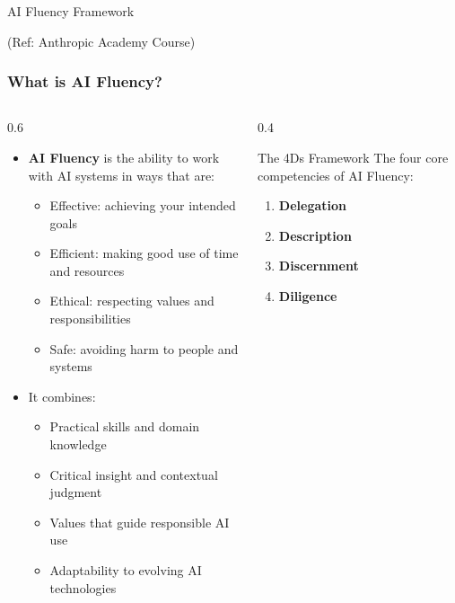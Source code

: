\begin{frame}[fragile]\frametitle{}
\begin{center}
{\Large AI Fluency Framework}

{\tiny (Ref: Anthropic Academy Course)}
\end{center}
\end{frame}

\begin{frame}[fragile]\frametitle{What is AI Fluency?}
\begin{columns}
    \begin{column}[T]{0.6\linewidth}
      \begin{itemize}
        \item \textbf{AI Fluency} is the ability to work with AI systems in ways that are:
          \begin{itemize}
            \item Effective: achieving your intended goals
            \item Efficient: making good use of time and resources
            \item Ethical: respecting values and responsibilities
            \item Safe: avoiding harm to people and systems
          \end{itemize}
        \item It combines:
          \begin{itemize}
            \item Practical skills and domain knowledge
            \item Critical insight and contextual judgment
            \item Values that guide responsible AI use
            \item Adaptability to evolving AI technologies
          \end{itemize}
      \end{itemize}
    \end{column}
    \begin{column}[T]{0.4\linewidth}
      \begin{block}{The 4Ds Framework}
        The four core competencies of AI Fluency:
        \begin{enumerate}
          \item \textbf{Delegation}
          \item \textbf{Description}
          \item \textbf{Discernment}
          \item \textbf{Diligence}
        \end{enumerate}
      \end{block}
    \end{column}
  \end{columns}
\end{frame}

